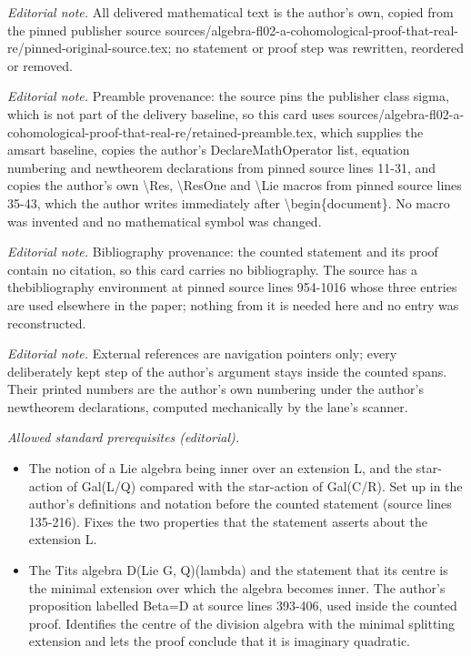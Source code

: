 \maketitle
\noindent\textit{Editorial note.} All delivered mathematical text is the author's own, copied from the pinned publisher source sources/algebra-fl02-a-cohomological-proof-that-real-re/pinned-original-source.tex; no statement or proof step was rewritten, reordered or removed.\par\medskip
\noindent\textit{Editorial note.} Preamble provenance: the source pins the publisher class sigma, which is not part of the delivery baseline, so this card uses sources/algebra-fl02-a-cohomological-proof-that-real-re/retained-preamble.tex, which supplies the amsart baseline, copies the author's DeclareMathOperator list, equation numbering and newtheorem declarations from pinned source lines 11-31, and copies the author's own \textbackslash{}Res, \textbackslash{}ResOne and \textbackslash{}Lie macros from pinned source lines 35-43, which the author writes immediately after \textbackslash{}begin\{document\}. No macro was invented and no mathematical symbol was changed.\par\medskip
\noindent\textit{Editorial note.} Bibliography provenance: the counted statement and its proof contain no citation, so this card carries no bibliography. The source has a thebibliography environment at pinned source lines 954-1016 whose three entries are used elsewhere in the paper; nothing from it is needed here and no entry was reconstructed.\par\medskip
\noindent\textit{Editorial note.} External references are navigation pointers only; every deliberately kept step of the author's argument stays inside the counted spans. Their printed numbers are the author's own numbering under the author's newtheorem declarations, computed mechanically by the lane's scanner.\par\medskip
\noindent\textit{Allowed standard prerequisites (editorial).}\begin{itemize}
\item The notion of a Lie algebra being inner over an extension L, and the star-action of Gal(L/Q) compared with the star-action of Gal(C/R). Set up in the author's definitions and notation before the counted statement (source lines 135-216). Fixes the two properties that the statement asserts about the extension L.
\item The Tits algebra D(Lie G, Q)(lambda) and the statement that its centre is the minimal extension over which the algebra becomes inner. The author's proposition labelled Beta=D at source lines 393-406, used inside the counted proof. Identifies the centre of the division algebra with the minimal splitting extension and lets the proof conclude that it is imaginary quadratic.
\end{itemize}\medskip
